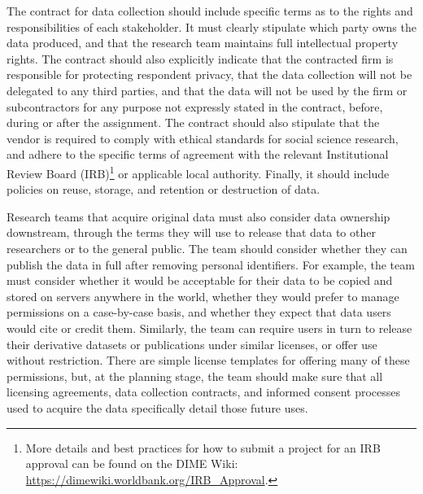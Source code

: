 \documentclass[
]{book}
\begin{document}
The contract for data collection should include specific terms
as to the rights and responsibilities of each stakeholder.
It must clearly stipulate which party owns the data produced,
and that the research team maintains full intellectual property rights.
The contract should also explicitly indicate that the contracted firm
is responsible for protecting respondent privacy,
that the data collection will not be delegated to any third parties,
and that the data will not be used by the firm or subcontractors for any purpose not expressly stated in the contract,
before, during or after the assignment.
The contract should also stipulate that the vendor is required to comply with
ethical standards for social science research,
and adhere to the specific terms of agreement with the relevant
Institutional Review Board (IRB)\footnote{More details and best practices for how to
  submit a project for an IRB approval
  can be found on the DIME Wiki:
  \url{https://dimewiki.worldbank.org/IRB_Approval}.}
or applicable local authority.
Finally, it should include policies on reuse, storage, and retention or destruction of data.

Research teams that acquire original data must also consider data ownership downstream,
through the terms they will use to release that data to other researchers or to the general public.
The team should consider whether they can publish the data in full after removing personal identifiers.
For example, the team must consider whether it would be acceptable for
their data to be copied and stored on servers anywhere in the world,
whether they would prefer to manage permissions on a case-by-case basis,
and whether they expect that data users would cite or credit them.
Similarly, the team can require users in turn to release
their derivative datasets or publications under similar licenses,
or offer use without restriction.
There are simple license templates for offering many of these permissions,
but, at the planning stage, the team should make sure
that all licensing agreements, data collection contracts,
and informed consent processes
used to acquire the data specifically detail those future uses.
\end{document}
